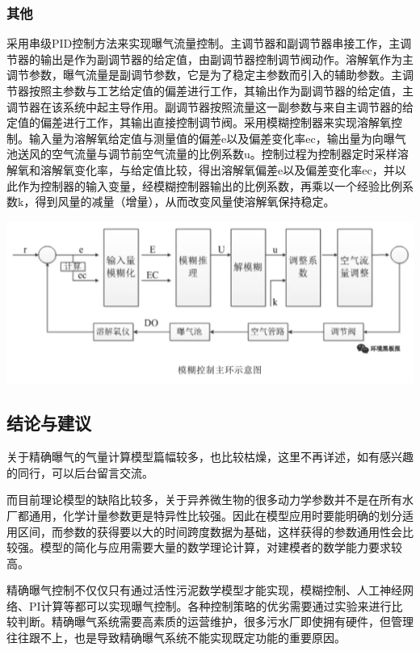 \documentclass[]{book}
\begin{document}
\hypertarget{ux5176ux4ed6}{%
\subsubsection{其他}\label{ux5176ux4ed6}}

采用串级PID控制方法来实现曝气流量控制。主调节器和副调节器串接工作，主调节器的输出是作为副调节器的给定值，由副调节器控制调节阀动作。溶解氧作为主调节参数，曝气流量是副调节参数，它是为了稳定主参数而引入的辅助参数。主调节器按照主参数与工艺给定值的偏差进行工作，其输出作为副调节器的给定值，主调节器在该系统中起主导作用。副调节器按照流量这一副参数与来自主调节器的给定值的偏差进行工作，其输出直接控制调节阀。采用模糊控制器来实现溶解氧控制。输入量为溶解氧给定值与测量值的偏差e以及偏差变化率ec，输出量为向曝气池送风的空气流量与调节前空气流量的比例系数u。控制过程为控制器定时采样溶解氧和溶解氧变化率，与给定值比较，得出溶解氧偏差e以及偏差变化率ec，并以此作为控制器的输入变量，经模糊控制器输出的比例系数，再乘以一个经验比例系数k，得到风量的减量（增量），从而改变风量使溶解氧保持稳定。

\includegraphics[width=8.33in]{images/bq7}

\hypertarget{ux7ed3ux8bbaux4e0eux5efaux8bae}{%
\subsection{结论与建议}\label{ux7ed3ux8bbaux4e0eux5efaux8bae}}

关于精确曝气的气量计算模型篇幅较多，也比较枯燥，这里不再详述，如有感兴趣的同行，可以后台留言交流。

而目前理论模型的缺陷比较多，关于异养微生物的很多动力学参数并不是在所有水厂都通用，化学计量参数更是特异性比较强。因此在模型应用时要能明确的划分适用区间，而参数的获得要以大的时间跨度数据为基础，这样获得的参数通用性会比较强。模型的简化与应用需要大量的数学理论计算，对建模者的数学能力要求较高。

精确曝气控制不仅仅只有通过活性污泥数学模型才能实现，模糊控制、人工神经网络、PI计算等都可以实现曝气控制。各种控制策略的优劣需要通过实验来进行比较判断。精确曝气系统需要高素质的运营维护，很多污水厂即使拥有硬件，但管理往往跟不上，也是导致精确曝气系统不能实现既定功能的重要原因。
\end{document}
